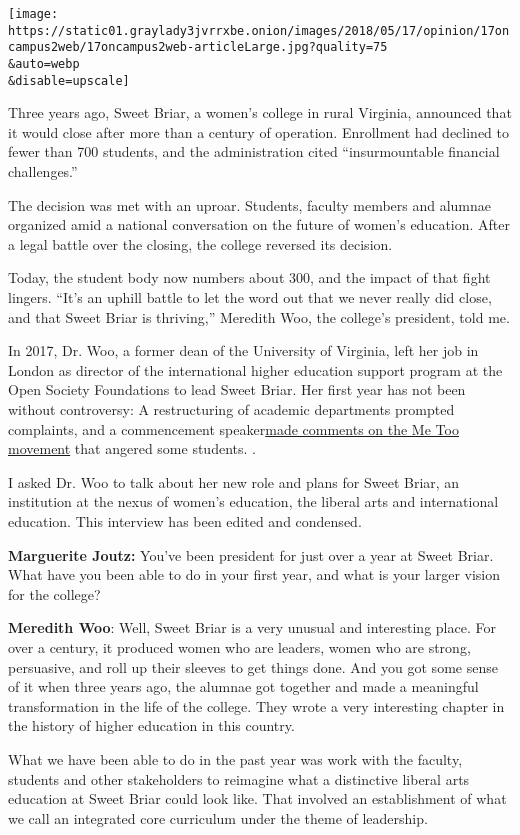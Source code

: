 \texttt{[image: https://static01.graylady3jvrrxbe.onion/images/2018/05/17/opinion/17oncampus2web/17oncampus2web-articleLarge.jpg?quality=75\\\&auto=webp\\\&disable=upscale]}

Three years ago, Sweet Briar, a women's college in rural Virginia,
announced that it would close after more than a century of operation.
Enrollment had declined to fewer than 700 students, and the
administration cited ``insurmountable financial challenges.''

The decision was met with an uproar. Students, faculty members and
alumnae organized amid a national conversation on the future of women's
education. After a legal battle over the closing, the college reversed
its decision.

Today, the student body now numbers about 300, and the impact of that
fight lingers. ``It's an uphill battle to let the word out that we never
really did close, and that Sweet Briar is thriving,'' Meredith Woo, the
college's president, told me.

In 2017, Dr. Woo, a former dean of the University of Virginia, left her
job in London as director of the international higher education support
program at the Open Society Foundations to lead Sweet Briar. Her first
year has not been without controversy: A restructuring of academic
departments prompted complaints, and a commencement
speaker\href{https://www.insidehighered.com/news/2018/05/14/anger-sweet-briar-over-commencement-speech}{made
comments on the Me Too movement} that angered some students. .

I asked Dr. Woo to talk about her new role and plans for Sweet Briar, an
institution at the nexus of women's education, the liberal arts and
international education. This interview has been edited and condensed.

\textbf{Marguerite Joutz:} You've been president for just over a year at
Sweet Briar. What have you been able to do in your first year, and what
is your larger vision for the college?

\textbf{Meredith Woo}: Well, Sweet Briar is a very unusual and
interesting place. For over a century, it produced women who are
leaders, women who are strong, persuasive, and roll up their sleeves to
get things done. And you got some sense of it when three years ago, the
alumnae got together and made a meaningful transformation in the life of
the college. They wrote a very interesting chapter in the history of
higher education in this country.

What we have been able to do in the past year was work with the faculty,
students and other stakeholders to reimagine what a distinctive liberal
arts education at Sweet Briar could look like. That involved an
establishment of what we call an integrated core curriculum under the
theme of leadership.

